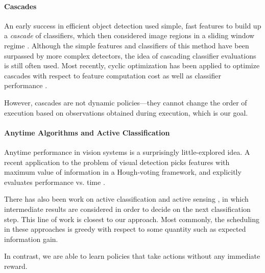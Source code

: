 \paragraph{Cascades}
An early success in efficient object detection used simple, fast features to build up a \emph{cascade} of classifiers, which then considered image regions in a sliding window regime \cite{Viola2001}.
Although the simple features and classifiers of this method have been surpassed by more complex detectors, the idea of cascading classifier evaluations is still often used.
Most recently, cyclic optimization has been applied to optimize cascades with respect to feature computation cost as well as classifier performance \cite{Chen2012}.

However, cascades are not dynamic policies---they cannot change the order of execution based on observations obtained during execution, which is our goal.

\paragraph{Anytime Algorithms and Active Classification}
Anytime performance in vision systems is a surprisingly little-explored idea.
A recent application to the problem of visual detection picks features with maximum value of information in a Hough-voting framework, and explicitly evaluates performance vs. time \cite{Vijayanarasimhan2010}. 

There has also been work on active classification \cite{Gao2011} and active sensing \cite{Yu2009}, in which intermediate results are considered in order to decide on the next classification step.
This line of work is closest to our approach.
Most commonly, the scheduling in these approaches is greedy with respect to some quantity such as expected information gain.

In contrast, we are able to learn policies that take actions without any immediate reward.
